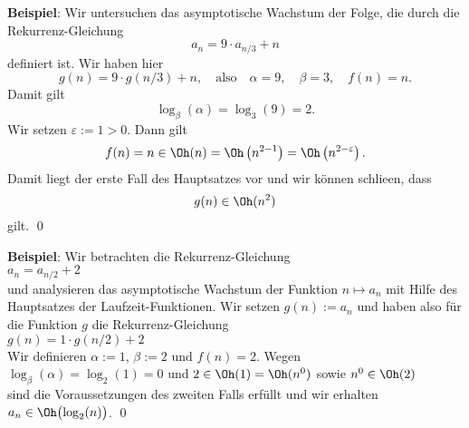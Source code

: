 \noindent
\textbf{Beispiel}:
Wir untersuchen das asymptotische Wachstum der Folge, die durch die Rekurrenz-Gleichung
\[ a_n = 9 \cdot a_{n/3} + n \]
definiert ist.  Wir haben hier 
\[ g(n) = 9 \cdot g(n/3) + n, \quad \mbox{also} \quad \alpha = 9, 
   \quad \beta = 3, \quad f(n) = n.
\]
Damit gilt 
\[ \log_\beta(\alpha) = \log_3(9) = 2. \]
Wir setzen $\varepsilon := 1 > 0$.  Dann gilt
\[ f(n) = n \in \Oh(n) = \Oh\left(n^{2-1}\right) = \Oh\left(n^{2-\varepsilon}\right). \]
Damit liegt der erste Fall des Hauptsatzes vor und wir k\"onnen schlie\3en, dass
\[ g(n) \in \Oh(n^2) \]
gilt. \qed
\vspace*{0.3cm}

\noindent
\textbf{Beispiel}:
Wir  betrachten die Rekurrenz-Gleichung 
\\[0.2cm]
\hspace*{1.3cm}
$a_n = a_{n/2} + 2$
\\[0.2cm]
und analysieren das asymptotische Wachstum der Funktion $n \mapsto a_n$ mit Hilfe des
Hauptsatzes der Laufzeit-Funktionen.
Wir setzen $g(n) := a_n$ und haben also f\"ur die Funktion $g$ die Rekurrenz-Gleichung
\\[0.2cm]
\hspace*{1.3cm}
$g(n) = 1 \cdot g\left(n/2\right) + 2$
\\[0.2cm]
Wir definieren $\alpha := 1$, $\beta := 2$ und $f(n) = 2$.  Wegen 
\\[0.2cm]
\hspace*{1.3cm}
$\log_\beta(\alpha) = \log_2(1) = 0$ \quad und \quad
$2 \in \Oh(1)= \Oh(n^0)$ \quad sowie \quad $n^0 \in \Oh(2)$
\\[0.2cm]
sind die Voraussetzungen des zweiten Falls erf\"ullt und wir erhalten 
\\[0.2cm]
\hspace*{1.3cm}
$a_n \in \Oh\bigl(\log_2(n)\bigr)$.
\qed
\vspace*{0.3cm}

